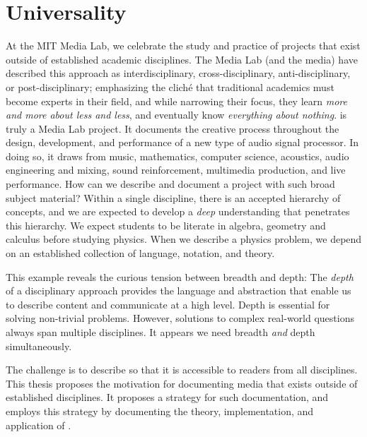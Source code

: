 \section{Universality}
\label{sec:universality}
At the MIT Media Lab, we celebrate the study and practice of projects
that exist outside of established academic disciplines. The Media Lab
(and the media) have described this approach as interdisciplinary,
cross-disciplinary, anti-disciplinary, or post-disciplinary;
emphasizing the clich\'{e} that traditional academics must become
experts in their field, and while narrowing their focus, they learn
\textit{more and more about less and less}, and eventually know
\textit{everything about nothing}.  \thesis is truly a Media Lab
project. It documents the creative process throughout the design,
development, and performance of a new type of audio signal
processor. In doing so, it draws from music, mathematics, computer
science, acoustics, audio engineering and mixing, sound reinforcement,
multimedia production, and live performance. How can we describe and
document a project with such broad subject material? Within a single
discipline, there is an accepted hierarchy of concepts, and we are
expected to develop a \emph{deep} understanding that penetrates this
hierarchy. We expect students to be literate in algebra, geometry and
calculus before studying physics. When we describe a physics problem,
we depend on an established collection of language, notation, and
theory.

This example reveals the curious tension between breadth and depth:
The \textit{depth} of a disciplinary approach provides the language
and abstraction that enable us to describe content and communicate at
a high level. Depth is essential for solving non-trivial
problems. However, solutions to complex real-world questions always
span multiple disciplines. It appears we need breadth \emph{and}
depth simultaneously.

The challenge is to describe \thesis so that it is accessible to
readers from all disciplines. This thesis proposes the motivation for
documenting media that exists outside of established disciplines. It
proposes a strategy for such documentation, and employs this strategy
by documenting the theory, implementation, and application of \thesis.

